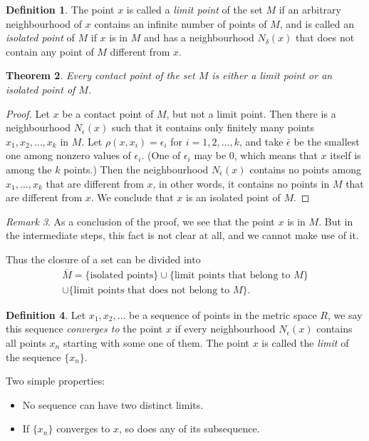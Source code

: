 \documentclass[a4paper,12pt]{article}
\newtheorem{thm}{Theorem}[section]
\theoremstyle{definition}
\newtheorem{defn}[thm]{Definition}
\theoremstyle{remark}
\newtheorem{rmk}[thm]{Remark}
\begin{document}
\begin{defn}
  The point $x$ is called a \emph{limit point} of the set $M$ if an arbitrary neighbourhood of $x$ contains an infinite number of points of $M$, and is called an \emph{isolated point} of $M$ if $x$ is in $M$ and has a neighbourhood $N_{\delta}(x)$ that does not contain any point of $M$ different from $x$.
\end{defn}

\begin{thm}
  Every contact point of the set $M$ is either a limit point or an isolated point of $M$.
\end{thm}
\begin{proof}
  Let $x$ be a contact point of $M$, but not a limit point. Then there is a neighbourhood $N_{\epsilon}(x)$ such that it contains only finitely many points $x_1, x_2, \dotsc, x_k$ in $M$. Let $\rho(x, x_i) = \epsilon_i$ for $i = 1, 2, \dotsc, k$, and take $\bar{\epsilon}$ be the smallest one among nonzero values of $\epsilon_i$. (One of $\epsilon_i$ may be $0$, which means that $x$ itself is among the $k$ points.) Then the neighbourhood $N_{\bar{\epsilon}}(x)$ contains no points among $x_1, \dotsc, x_k$ that are different from $x$, in other words, it contains no points in $M$ that are different from $x$. We conclude that $x$ is an isolated point of $M$.
\end{proof}
\begin{rmk}
  As a conclusion of the proof, we see that the point $x$ is in $M$. But in the intermediate steps, this fact is not clear at all, and we cannot make use of it.
\end{rmk}

Thus the closure of a set can be divided into
\begin{multline*}
  \overline{M} = \{ \text{isolated points} \} \cup \{ \text{limit points that belong to $M$} \} \\
  \cup \{ \text{limit points that does not belong to $M$} \}.
\end{multline*}

\begin{defn}
  Let $x_1, x_2, \dotsc$ be a sequence of points in the metric space $R$, we say this sequence \emph{converges to } the point $x$ if every neighbourhood $N_{\epsilon}(x)$ contains all points $x_n$ starting with some one of them. The point $x$ is called the \emph{limit} of the sequence $\{ x_n \}$.
\end{defn}

Two simple properties:
\begin{itemize}
\item No sequence can have two distinct limits.
\item If $\{ x_n \}$ converges to $x$, so does any of its subsequence.
\end{itemize}
\end{document}
